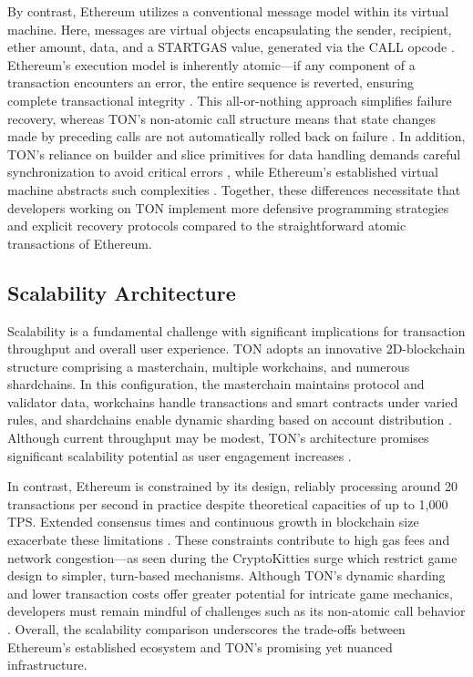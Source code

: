 By contrast, Ethereum utilizes a conventional message model within its virtual
machine. Here, messages are virtual objects encapsulating the sender, recipient,
ether amount, data, and a STARTGAS value, generated via the CALL opcode
\cite{EthereumWhitepaper2025}. Ethereum’s execution model is inherently
atomic—if any component of a transaction encounters an error, the entire
sequence is reverted, ensuring complete transactional integrity
\cite{buterinEthereumNextGenerationSmart2014}. This all-or-nothing approach
simplifies failure recovery, whereas TON’s non-atomic call structure means that
state changes made by preceding calls are not automatically rolled back on
failure \cite{songEnhancingOpenNetwork2025}. In addition, TON’s reliance on
builder and slice primitives for data handling demands careful synchronization
to avoid critical errors \cite{songEnhancingOpenNetwork2025}, while Ethereum’s
established virtual machine abstracts such complexities
\cite{EthereumWhitepaper2025}. Together, these differences necessitate that
developers working on TON implement more defensive programming strategies and
explicit recovery protocols compared to the straightforward atomic transactions
of Ethereum.

\subsection{Scalability Architecture}

Scalability is a fundamental challenge with significant implications for
transaction throughput and overall user experience. TON adopts an innovative
2D-blockchain structure comprising a masterchain, multiple workchains, and
numerous shardchains. In this configuration, the masterchain maintains protocol
and validator data, workchains handle transactions and smart contracts under
varied rules, and shardchains enable dynamic sharding based on account
distribution . Although current throughput may be modest, TON’s architecture
promises significant scalability potential as user engagement increases
\cite{durovTelegramOpenNetwork2020}.

In contrast, Ethereum is constrained by its design, reliably processing around
20 transactions per second in practice despite theoretical capacities of up to
1,000 TPS. Extended consensus times and continuous growth in blockchain size
exacerbate these limitations \cite{khanSystematicLiteratureReview2021}. These constraints contribute to high gas fees and network
congestion—as seen during the CryptoKitties surge
\cite{caiDecentralizedApplicationsBlockchainEmpowered2018, jiangCryptoKittiesTransactionNetwork2021} which
restrict game design to simpler, turn-based mechanisms. Although TON’s dynamic
sharding and lower transaction costs offer greater potential for intricate game
mechanics, developers must remain mindful of challenges such as its non-atomic
call behavior \cite{songEnhancingOpenNetwork2025}. Overall, the
scalability comparison underscores the trade-offs between Ethereum’s established
ecosystem and TON’s promising yet nuanced infrastructure.

